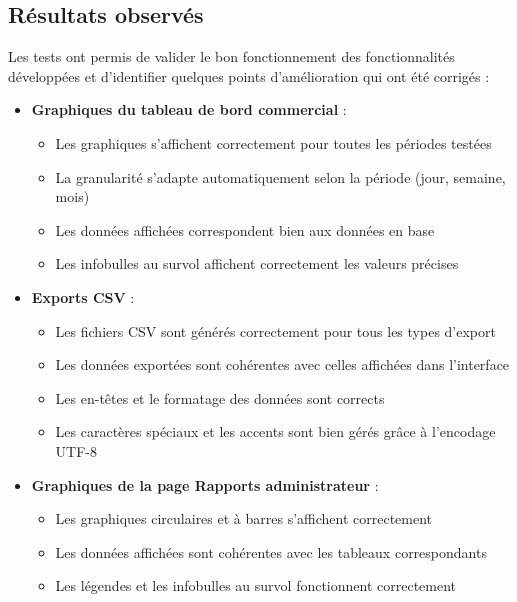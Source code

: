 \documentclass[a4paper,12pt]{report}
\begin{document}
  \subsection{Résultats observés}
  Les tests ont permis de valider le bon fonctionnement des fonctionnalités développées et d'identifier quelques points d'amélioration qui ont été corrigés :
  
  \begin{itemize}
    \item \textbf{Graphiques du tableau de bord commercial} :
    \begin{itemize}
      \item Les graphiques s'affichent correctement pour toutes les périodes testées
      \item La granularité s'adapte automatiquement selon la période (jour, semaine, mois)
      \item Les données affichées correspondent bien aux données en base
      \item Les infobulles au survol affichent correctement les valeurs précises
    \end{itemize}
    
    \item \textbf{Exports CSV} :
    \begin{itemize}
      \item Les fichiers CSV sont générés correctement pour tous les types d'export
      \item Les données exportées sont cohérentes avec celles affichées dans l'interface
      \item Les en-têtes et le formatage des données sont corrects
      \item Les caractères spéciaux et les accents sont bien gérés grâce à l'encodage UTF-8
    \end{itemize}
    
    \item \textbf{Graphiques de la page Rapports administrateur} :
    \begin{itemize}
      \item Les graphiques circulaires et à barres s'affichent correctement
      \item Les données affichées sont cohérentes avec les tableaux correspondants
      \item Les légendes et les infobulles au survol fonctionnent correctement
    \end{itemize}
    
  \end{itemize}
\end{document}
